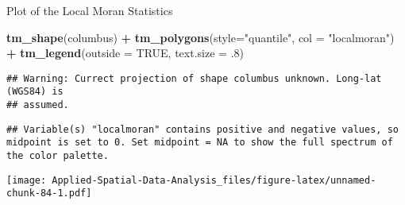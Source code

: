 \documentclass[
]{book}
\newenvironment{Shaded}{\begin{snugshade}}{\end{snugshade}}
\newcommand{\DataTypeTok}[1]{\textcolor[rgb]{0.13,0.29,0.53}{#1}}
\newcommand{\FloatTok}[1]{\textcolor[rgb]{0.00,0.00,0.81}{#1}}
\newcommand{\KeywordTok}[1]{\textcolor[rgb]{0.13,0.29,0.53}{\textbf{#1}}}
\newcommand{\NormalTok}[1]{#1}
\newcommand{\OperatorTok}[1]{\textcolor[rgb]{0.81,0.36,0.00}{\textbf{#1}}}
\newcommand{\OtherTok}[1]{\textcolor[rgb]{0.56,0.35,0.01}{#1}}
\newcommand{\StringTok}[1]{\textcolor[rgb]{0.31,0.60,0.02}{#1}}
\begin{document}
Plot of the Local Moran Statistics

\begin{Shaded}
\begin{Highlighting}[]
\KeywordTok{tm_shape}\NormalTok{(columbus) }\OperatorTok{+}\StringTok{ }\KeywordTok{tm_polygons}\NormalTok{(}\DataTypeTok{style=}\StringTok{"quantile"}\NormalTok{, }\DataTypeTok{col =} \StringTok{"localmoran"}\NormalTok{) }\OperatorTok{+}
\StringTok{     }\KeywordTok{tm_legend}\NormalTok{(}\DataTypeTok{outside =} \OtherTok{TRUE}\NormalTok{, }\DataTypeTok{text.size =} \FloatTok{.8}\NormalTok{)}
\end{Highlighting}
\end{Shaded}

\begin{verbatim}
## Warning: Currect projection of shape columbus unknown. Long-lat (WGS84) is
## assumed.
\end{verbatim}

\begin{verbatim}
## Variable(s) "localmoran" contains positive and negative values, so midpoint is set to 0. Set midpoint = NA to show the full spectrum of the color palette.
\end{verbatim}

\texttt{[image: Applied-Spatial-Data-Analysis\_files/figure-latex/unnamed-chunk-84-1.pdf]}

  
\end{document}
